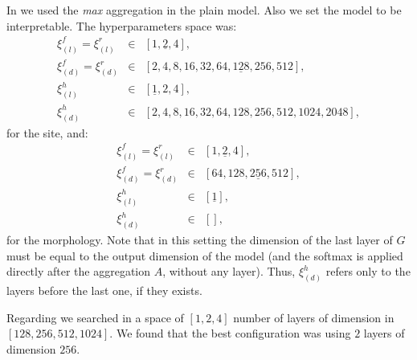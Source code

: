 In \maxi{} we used the \emph{max} aggregation in the plain
model. Also we set the model to be interpretable. The hyperparameters
space was: 
\begin{align*}
  \xi_{(l)}^f=\xi_{(l)}^r&\in&[1,\underline{2},4],\\
  \xi_{(d)}^f=\xi_{(d)}^r&\in&[2,4,8,16,32,64,\underline{128},256,512],\\
  \xi_{(l)}^h&\in&[\underline{1},2,4],\\
  \xi_{(d)}^h&\in&[2,4,8,16,32,64,128,256,512,1024,2048],
\end{align*}
for the site, and:
\begin{align*}
  \xi_{(l)}^f=\xi_{(l)}^r&\in&[1,\underline{2},4],\\
  \xi_{(d)}^f=\xi_{(d)}^r&\in&[64,128,\underline{256},512],\\
  \xi_{(l)}^h&\in&[\underline{1}],\\
  \xi_{(d)}^h&\in&[],
\end{align*}
for the morphology. Note that in this setting the dimension of the
last layer of $G$ must be equal to the output dimension of the model
(and the softmax is applied directly after the aggregation $A$,
without any layer). Thus, $\xi_{(d)}^h$ refers only to the
layers before the last one, if they exists.

Regarding \gru{} we searched in a space of $[1,2,4]$ number of layers of
dimension in $[128,256,512,1024]$. We found that the best
configuration was using $2$ layers of dimension $256$.





